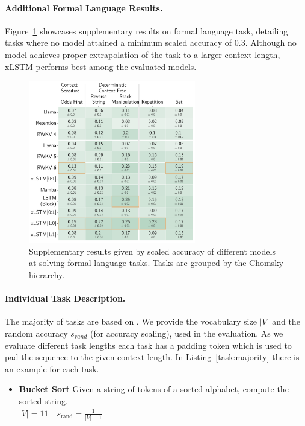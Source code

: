 \documentclass[dvipsnames]{article}
\begin{document}
\begin{appendix}
\paragraph{Additional Formal Language Results.} Figure~\ref{fig:formal-appendix} showcases supplementary results
on formal language task, detailing tasks where no model attained a minimum scaled accuracy of 0.3. Although no model achieves proper extrapolation of the task to a larger context length, xLSTM performs best among the evaluated models.  

\begin{figure}
\centering
\includegraphics[width=0.65\textwidth]{figures/Chomsky_Appendix.pdf}
\caption{Supplementary results given by scaled accuracy of different models at 
   solving formal language tasks. 
   Tasks are grouped by 
   the Chomsky hierarchy. \label{fig:formal-appendix}}
\end{figure}

\paragraph{Individual Task Description.}
The majority of tasks are based on \citet{Deletang:23}.
We provide the vocabulary size $|V|$ and the random accuracy $s_{rand}$ (for accuracy scaling), used in the evaluation.
As we evaluate different task lengths each task has a padding token which is used to pad the sequence to the given context length.
In Listing~\ref{task:majority} there is an example for each task.

\begin{itemize}
    \item\textbf{Bucket Sort}
    Given a string of tokens of a sorted alphabet, compute the sorted string. \\
    $|V|=11 \quad s_{\text{rand}}=\frac{1}{|V| - 1}$


\end{itemize}
\end{appendix}
\end{document}
